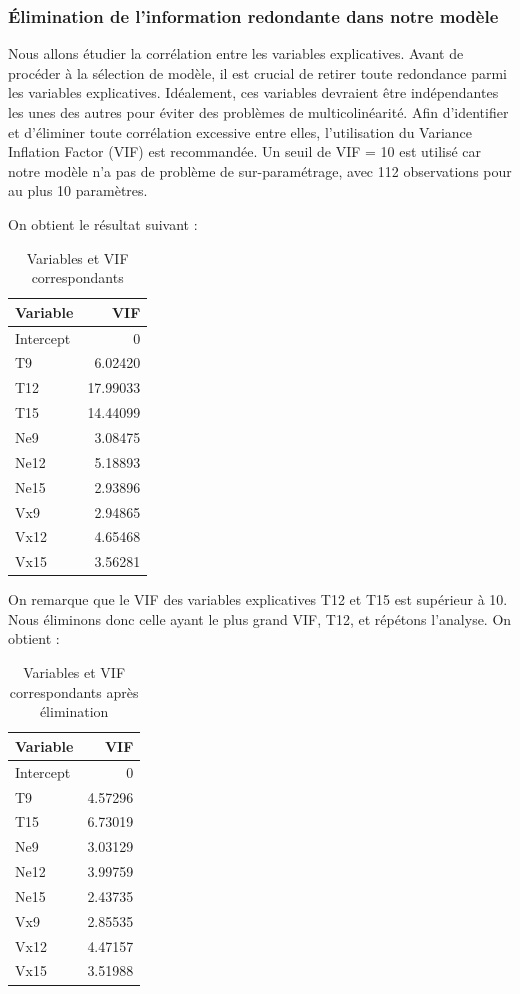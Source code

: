 \documentclass[12pt,a4paper]{article}
\begin{document}
\subsubsection{Élimination de l'information redondante dans notre modèle}
Nous allons étudier la corrélation entre les variables explicatives. Avant de procéder à la sélection de modèle, il est crucial de retirer toute redondance parmi les variables explicatives. Idéalement, ces variables devraient être indépendantes les unes des autres pour éviter des problèmes de multicolinéarité. Afin d'identifier et d'éliminer toute corrélation excessive entre elles, l'utilisation du Variance Inflation Factor (VIF) est recommandée. Un seuil de VIF = 10 est utilisé car notre modèle n'a pas de problème de sur-paramétrage, avec 112 observations pour au plus 10 paramètres.

On obtient le résultat suivant :

\begin{table}[H]
	\centering
	\begin{tabular}{|l|r|}
		\hline
		\textbf{Variable} & \textbf{VIF} \\
		\hline
		Intercept & 0 \\
		T9 & 6.02420 \\
		T12 & 17.99033 \\
		T15 & 14.44099 \\
		Ne9 & 3.08475 \\
		Ne12 & 5.18893 \\
		Ne15 & 2.93896 \\
		Vx9 & 2.94865 \\
		Vx12 & 4.65468 \\
		Vx15 & 3.56281 \\
		\hline
	\end{tabular}
	\caption{Variables et VIF correspondants}
\end{table}

On remarque que le VIF des variables explicatives T12 et T15 est supérieur à 10. Nous éliminons donc celle ayant le plus grand VIF, T12, et répétons l'analyse. On obtient :

\begin{table}[H]
	\centering
	\begin{tabular}{|l|r|}
		\hline
		\textbf{Variable} & \textbf{VIF} \\
		\hline
		Intercept & 0 \\
		T9 & 4.57296 \\
		T15 & 6.73019 \\
		Ne9 & 3.03129 \\
		Ne12 & 3.99759 \\
		Ne15 & 2.43735 \\
		Vx9 & 2.85535 \\
		Vx12 & 4.47157 \\
		Vx15 & 3.51988 \\
		\hline
	\end{tabular}
	\caption{Variables et VIF correspondants après élimination}
\end{table}
\end{document}
